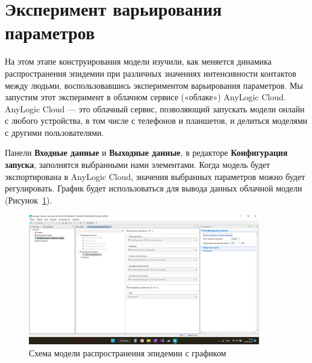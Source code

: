 \section{Эксперимент варьирования параметров}
На этом этапе конструирования модели изучили, как меняется динамика
распространения эпидемии при различных значениях интенсивности контактов
между людьми, воспользовавшись экспериментом варьирования параметров.
Мы запустим этот эксперимент в облачном сервисе («облаке») AnyLogic Cloud.
AnyLogic Cloud --- это облачный сервис, позволяющий запускать модели
онлайн с любого устройства, в том числе с телефонов и планшетов, и
делиться моделями с другими пользователями.\par
Панели \textbf{Входные данные} и \textbf{Выходные данные}, в редакторе
\textbf{Конфигурация запуска}, заполнятся выбранными нами элементами.
Когда модель будет экспортирована в
AnyLogic Cloud, значения выбранных параметров можно будет регулировать.
График будет использоваться для вывода данных облачной модели
(Рисунок~\ref{fig:anlg:confrun}).

\begin{figure}[h!tp]
	\centering
	\includegraphics[width=0.9\textwidth]{2023-03-18_17-05-05}
	\caption{Схема модели распространения эпидемии с графиком}
	\label{fig:anlg:confrun}
\end{figure}

